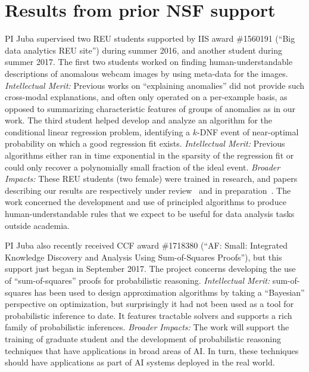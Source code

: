 \documentclass[12pt]{article}
\begin{document}
\section{Results from prior NSF support}
PI Juba supervised two REU students supported by IIS award \#1560191 (``Big data analytics REU site'') during summer 2016, and another student during summer 2017. The first two students worked on finding human-understandable descriptions of anomalous webcam images by using meta-data for the images. {\em Intellectual Merit:} Previous works on ``explaining anomalies'' did not provide such cross-modal explanations, and often only operated on a per-example basis, as opposed to summarizing characteristic features of groups of anomalies as in our work. The third student helped develop and analyze an algorithm for the conditional linear regression problem, identifying a $k$-DNF event of near-optimal probability on which a good regression fit exists. {\em Intellectual Merit:} Previous algorithms either ran in time exponential in the sparsity of the regression fit or could only recover a polynomially small fraction of the ideal event. {\em Broader Impacts:} These REU students (two female) were trained in research, and papers describing our results are respectively under review~\cite{qi2018} and in preparation~\cite{calderon2018}. The work concerned the development and use of principled algorithms to produce human-understandable rules that we expect to be useful for data analysis tasks outside academia. 

PI Juba also recently received CCF award \#1718380 (``AF: Small: Integrated Knowledge Discovery and Analysis Using Sum-of-Squares Proofs''), but this support just began in September 2017. The project concerns developing the use of ``sum-of-squares'' proofs for probabilistic reasoning. {\em Intellectual Merit:} sum-of-squares has been used to design approximation algorithms by taking a ``Bayesian'' perspective on optimization, but surprisingly it had not been used as a tool for probabilistic inference to date. It features tractable solvers and supports a rich family of probabilistic inferences. {\em Broader Impacts:} The work will support the training of graduate student and the development of probabilistic reasoning techniques that have applications in broad areas of AI. In turn, these techniques should have applications as part of AI systems deployed in the real world.

\pagebreak



\newpage
\end{document}
